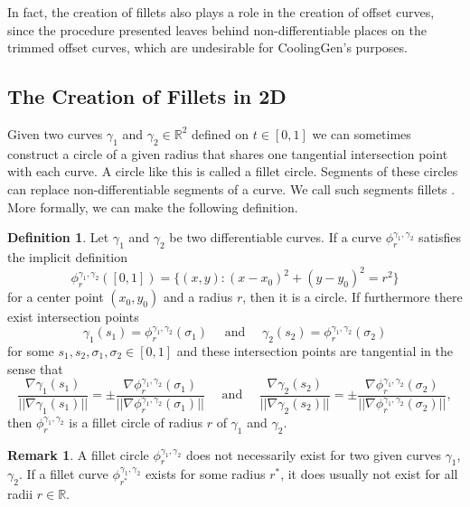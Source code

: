 \documentclass[a4paper, 11pt]{report}
\theoremstyle{definition}
\newtheorem{definition}{Definition}[section]
\newtheorem*{remark}{Remark}
\begin{document}
	In fact, the creation of fillets also plays a role in the creation of offset curves, since the procedure presented leaves behind non-differentiable places on the trimmed offset curves, which are undesirable for CoolingGen's purposes.

\subsection{The Creation of Fillets in 2D}\label{sec:filletcurves}
	Given two curves $\gamma_1$ and $\gamma_2 \in \mathbb{R}^2$ defined on $t \in [0,1]$ we can sometimes construct a circle of a given radius that shares one tangential intersection point with each curve. A circle like this is called a fillet circle. Segments of these circles can replace non-differentiable segments of a curve. We call such segments fillets \cite{Sorby2016}. More formally, we can make the following definition.

	\begin{definition}\label{def:filletcircle}
		Let $\gamma_1$ and $\gamma_2$ be two differentiable curves.
		If a curve $\phi^{\gamma_1, \gamma_2}_r$ satisfies the implicit definition
			$$\phi^{\gamma_1, \gamma_2}_r([0,1]) = \{(x,y) : (x-x_0)^2 + (y-y_0)^2 = r^2\}$$
		for a center point $(x_0, y_0)$ and a radius $r$, then it is a circle. If furthermore there exist intersection points
			$$ \gamma_1(s_1) = \phi^{\gamma_1, \gamma_2}_r(\sigma_1) \quad\text{ and }\quad \gamma_2(s_2) = \phi^{\gamma_1, \gamma_2}_r(\sigma_2) $$
		for some $s_1, s_2, \sigma_1, \sigma_2 \in [0,1]$ and these intersection points are tangential in the sense that
			$$
				\frac{\nabla \gamma_1(s_1)}{||\nabla \gamma_1(s_1)||} = 
				\pm\frac{\nabla \phi^{\gamma_1, \gamma_2}_r(\sigma_1)}{||\nabla \phi^{\gamma_1, \gamma_2}_r(\sigma_1)||} 
				\quad\text{ and }\quad 
				\frac{\nabla \gamma_2(s_2)}{||\nabla \gamma_2(s_2)||} =  
				\pm\frac{\nabla \phi^{\gamma_1, \gamma_2}_r(\sigma_2)}{||\nabla \phi^{\gamma_1, \gamma_2}_r(\sigma_2)||},
			$$
		then $\phi^{\gamma_1, \gamma_2}_r$ is a fillet circle of radius $r$ of $\gamma_1$ and $\gamma_2$.
	\end{definition}
	\begin{remark}
		A fillet circle $\phi^{\gamma_1, \gamma_2}_r$ does not necessarily exist for two given curves $\gamma_1$, $\gamma_2$. If a fillet 
		curve $\phi^{\gamma_1, \gamma_2}_{r^*}$ exists for some radius $r^*$, it does usually not exist for all radii $r \in \mathbb{R}$.
	\end{remark}
\end{document}
